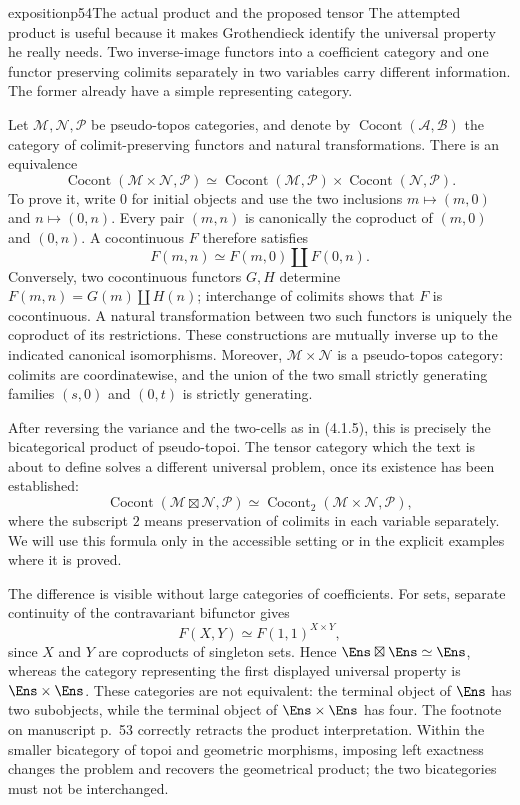 \begin{dcomment}{exposition}{p54}{The actual product and the proposed tensor}
The attempted product is useful because it makes Grothendieck identify the universal property he really needs. Two inverse-image functors into a coefficient category and one functor preserving colimits separately in two variables carry different information. The former already have a simple representing category.

Let $\mathcal M,\mathcal N,\mathcal P$ be pseudo-topos categories, and denote by $\operatorname{Cocont}(\mathcal A,\mathcal B)$ the category of colimit-preserving functors and natural transformations. There is an equivalence
\[
 \operatorname{Cocont}(\mathcal M\times\mathcal N,\mathcal P)
 \simeq
 \operatorname{Cocont}(\mathcal M,\mathcal P)
 \times\operatorname{Cocont}(\mathcal N,\mathcal P).
\]
To prove it, write $0$ for initial objects and use the two inclusions $m\mapsto(m,0)$ and $n\mapsto(0,n)$. Every pair $(m,n)$ is canonically the coproduct of $(m,0)$ and $(0,n)$. A cocontinuous $F$ therefore satisfies
\[
 F(m,n)\simeq F(m,0)\amalg F(0,n).
\]
Conversely, two cocontinuous functors $G,H$ determine $F(m,n)=G(m)\amalg H(n)$; interchange of colimits shows that $F$ is cocontinuous. A natural transformation between two such functors is uniquely the coproduct of its restrictions. These constructions are mutually inverse up to the indicated canonical isomorphisms. Moreover, $\mathcal M\times\mathcal N$ is a pseudo-topos category: colimits are coordinatewise, and the union of the two small strictly generating families $(s,0)$ and $(0,t)$ is strictly generating.

After reversing the variance and the two-cells as in (4.1.5), this is precisely the bicategorical product of pseudo-topoi. The tensor category which the text is about to define solves a different universal problem, once its existence has been established:
\[
 \operatorname{Cocont}(\mathcal M\boxtimes\mathcal N,\mathcal P)
 \simeq \operatorname{Cocont}_{2}(\mathcal M\times\mathcal N,\mathcal P),
\]
where the subscript $2$ means preservation of colimits in each variable separately. We will use this formula only in the accessible setting or in the explicit examples where it is proved.

The difference is visible without large categories of coefficients. For sets, separate continuity of the contravariant bifunctor gives
\[
 F(X,Y)\simeq F(1,1)^{X\times Y},
\]
since $X$ and $Y$ are coproducts of singleton sets. Hence $\Ens\boxtimes\Ens\simeq\Ens$, whereas the category representing the first displayed universal property is $\Ens\times\Ens$. These categories are not equivalent: the terminal object of $\Ens$ has two subobjects, while the terminal object of $\Ens\times\Ens$ has four. The footnote on manuscript p.~53 correctly retracts the product interpretation. Within the smaller bicategory of topoi and geometric morphisms, imposing left exactness changes the problem and recovers the geometrical product; the two bicategories must not be interchanged.
\end{dcomment}

